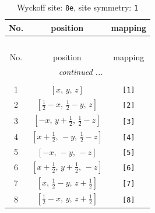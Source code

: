 \documentclass[fleqn,8pt]{jsarticle}
\begin{document}
\renewcommand{\arraystretch}{1.2}
\begin{longtable}{ccc}
\caption{Wyckoff site: {\tt 8e}, site symmetry: {\tt 1}}
 \\
 \hline \hline
No. & position & mapping \\ \hline \endfirsthead

\multicolumn{2}{l}{\tablename\ \thetable{}} \\
 \hline \hline
No. & position & mapping \\ \hline \endhead

 \hline \hline
\multicolumn{2}{r}{\footnotesize\it continued ...} \\ \endfoot

 \hline \hline
\multicolumn{2}{r}{} \\ \endlastfoot

1 & $\left[ x,\, y,\, z \right]$ & {\tt [1]} \\ \hline
2 & $\left[ \frac{1}{2} - x,\, \frac{1}{2} - y,\, z \right]$ & {\tt [2]} \\ \hline
3 & $\left[ - x,\, y + \frac{1}{2},\, \frac{1}{2} - z \right]$ & {\tt [3]} \\ \hline
4 & $\left[ x + \frac{1}{2},\, - y,\, \frac{1}{2} - z \right]$ & {\tt [4]} \\ \hline
5 & $\left[ - x,\, - y,\, - z \right]$ & {\tt [5]} \\ \hline
6 & $\left[ x + \frac{1}{2},\, y + \frac{1}{2},\, - z \right]$ & {\tt [6]} \\ \hline
7 & $\left[ x,\, \frac{1}{2} - y,\, z + \frac{1}{2} \right]$ & {\tt [7]} \\ \hline
8 & $\left[ \frac{1}{2} - x,\, y,\, z + \frac{1}{2} \right]$ & {\tt [8]} \\
\end{longtable}
\end{document}
